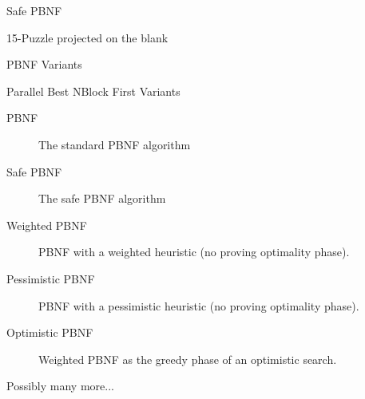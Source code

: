 \documentclass[style=unh]{powerdot}
\begin{document}
\begin{slide}{Safe PBNF}
{\begin{center}
    \end{center}
  }
   {
    \vspace{-.3in}
    \begin{center}
      15-Puzzle projected on the blank
    \end{center}
  }

\end{slide}


\begin{slide}{PBNF Variants}
  \vspace{.2in}
  \begin{center}
    Parallel Best NBlock First Variants
  \end{center}
  \begin{description}
  \item[PBNF] The standard PBNF algorithm
  \item[Safe PBNF] The safe PBNF algorithm
  \item[Weighted PBNF] PBNF with a weighted heuristic (no proving
    optimality phase).
  \item[Pessimistic PBNF] PBNF with a pessimistic heuristic (no proving
    optimality phase).
  \item[Optimistic PBNF] Weighted PBNF as the greedy phase of an optimistic search.
  \item[Possibly many more...]
  \end{description}
\end{slide}
\end{document}
